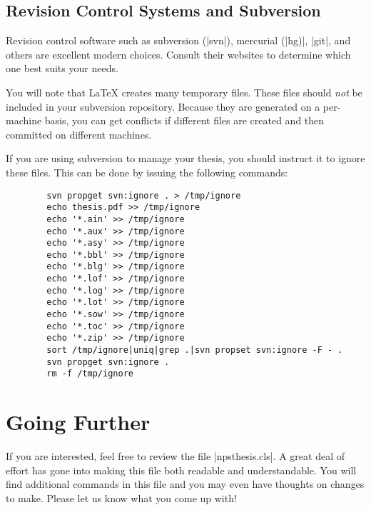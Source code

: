 \subsection{Revision Control Systems and Subversion}
Revision control software such as subversion (|svn|), mercurial (|hg)|, |git|, and others are excellent modern choices.  
Consult their websites to determine which one best suits your needs.

You will note that \LaTeX{} creates many temporary files. These files should \emph{not} be
included in your subversion repository. Because they are generated on a
per-machine basis, you can get conflicts if different files are
created and then committed on different machines.

If you are using subversion to manage your thesis, you should instruct it to ignore these files.  This
can be done by issuing the following commands:

\begin{Verbatim}
        svn propget svn:ignore . > /tmp/ignore
        echo thesis.pdf >> /tmp/ignore
        echo '*.ain' >> /tmp/ignore
        echo '*.aux' >> /tmp/ignore
        echo '*.asy' >> /tmp/ignore
        echo '*.bbl' >> /tmp/ignore
        echo '*.blg' >> /tmp/ignore
        echo '*.lof' >> /tmp/ignore
        echo '*.log' >> /tmp/ignore
        echo '*.lot' >> /tmp/ignore
        echo '*.sow' >> /tmp/ignore
        echo '*.toc' >> /tmp/ignore
        echo '*.zip' >> /tmp/ignore
        sort /tmp/ignore|uniq|grep .|svn propset svn:ignore -F - .
        svn propget svn:ignore .
        rm -f /tmp/ignore
\end{Verbatim}



\section{Going Further}
If you are interested, feel free to review the file
|npsthesis.cls|. A great deal of effort has gone into making this
file both readable and understandable. You will find additional
commands in this file and you may even have thoughts on changes to
make. Please let us know what you come up with!


